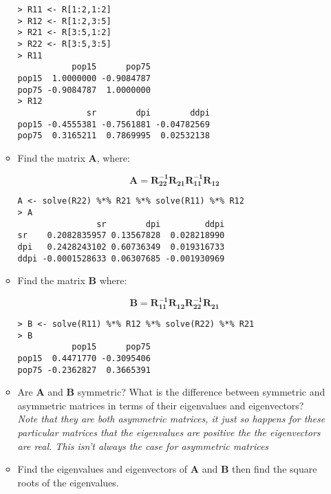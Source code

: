 \documentclass{article}
\begin{document}
\begin{enumerate}
\begin{itemize}
\begin{verbatim}
> R11 <- R[1:2,1:2]
> R12 <- R[1:2,3:5]
> R21 <- R[3:5,1:2]
> R22 <- R[3:5,3:5]
> R11
           pop15      pop75
pop15  1.0000000 -0.9084787
pop75 -0.9084787  1.0000000
> R12
              sr        dpi        ddpi
pop15 -0.4555381 -0.7561881 -0.04782569
pop75  0.3165211  0.7869995  0.02532138
\end{verbatim}

\item Find the matrix $\boldsymbol{A}$, where:

\begin{displaymath}
\boldsymbol{A} = \boldsymbol{R_{22}^{-1}R_{21}R_{11}^{-1}R_{12}}
\end{displaymath}

\begin{verbatim}
A <- solve(R22) %*% R21 %*% solve(R11) %*% R12
> A
                sr        dpi         ddpi
sr    0.2082835957 0.13567828  0.028218990
dpi   0.2428243102 0.60736349  0.019316733
ddpi -0.0001528633 0.06307685 -0.001930969
\end{verbatim}


\item Find the matrix $\boldsymbol{B}$ where:

\begin{displaymath}
\boldsymbol{B} = \boldsymbol{R_{11}^{-1}R_{12}R_{22}^{-1}R_{21}}
\end{displaymath}

\begin{verbatim}
> B <- solve(R11) %*% R12 %*% solve(R22) %*% R21
> B
           pop15      pop75
pop15  0.4471770 -0.3095406
pop75 -0.2362827  0.3665391
\end{verbatim}



\item Are $\boldsymbol{A}$ and $\boldsymbol{B}$ symmetric?   What is the difference between symmetric and asymmetric matrices in terms of their eigenvalues and eigenvectors?\\
\textit{Note that they are both asymmetric matrices, it just so happens for these particular matrices that the eigenvalues are positive the the eigenvectors are real.   This isn't always the case for asymmetric matrices}

\item Find the eigenvalues and eigenvectors of $\boldsymbol{A}$ and $\boldsymbol{B}$ then find the square roots of the eigenvalues.   



\end{itemize}
\end{enumerate}
\end{document}
